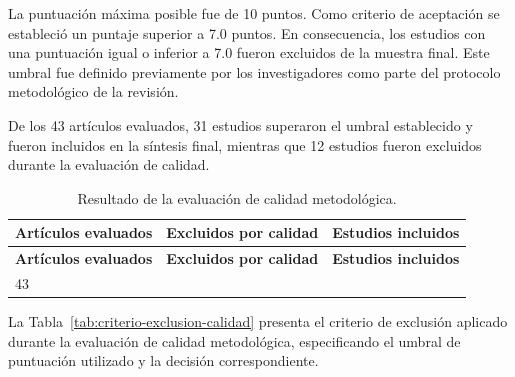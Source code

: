 \documentclass{iaesarticle}
\begin{document}
\vspace{0.5em}

La puntuación máxima posible fue de 10 puntos. Como criterio de aceptación se estableció un puntaje superior a 7.0 puntos. En consecuencia, los estudios con una puntuación igual o inferior a 7.0 fueron excluidos de la muestra final. Este umbral fue definido previamente por los investigadores como parte del protocolo metodológico de la revisión.

De los 43 artículos evaluados, 31 estudios superaron el umbral establecido y fueron incluidos en la síntesis final, mientras que 12 estudios fueron excluidos durante la evaluación de calidad.

\begin{longtable}{%
    |>{\centering\arraybackslash}p{}%
    |>{\centering\arraybackslash}p{}%
    |>{\centering\arraybackslash}p{}|}
\caption{Resultado de la evaluación de calidad metodológica.}
\label{tab:resultado_calidad}\\
\hline
\rowcolor{blue!10}
\textbf{Artículos evaluados} &
\textbf{Excluidos por calidad} &
\textbf{Estudios incluidos} \\ 
\hline
\endfirsthead

\hline
\rowcolor{blue!10}
\textbf{Artículos evaluados} &
\textbf{Excluidos por calidad} &
\textbf{Estudios incluidos} \\ 
\hline
\endhead

\hline
\endfoot

\hline
\endlastfoot

\scriptsize

43 & 12 & 31 \\ \hline

\end{longtable}

\vspace{0.5em}
\vspace{0.5em}

La Tabla~\ref{tab:criterio-exclusion-calidad} presenta el criterio de exclusión aplicado durante la evaluación de calidad metodológica, especificando el umbral de puntuación utilizado y la decisión correspondiente.
\end{document}
